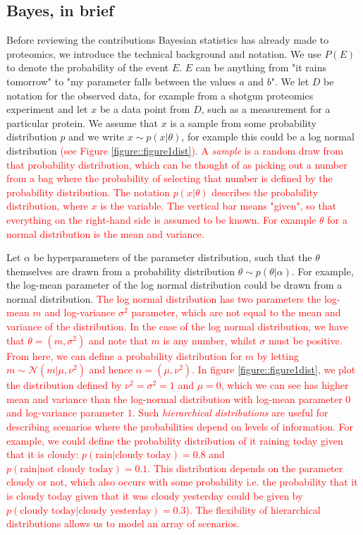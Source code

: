 \documentclass[12pt,english, journal=jpr, layout=twocolumn]{article}
\begin{document}
\subsection{Bayes, in brief}
Before reviewing the contributions Bayesian statistics has already made to proteomics, we introduce the technical background and notation. We use $P(E)$ to denote the probability of the event $E$. $E$ can be anything from "it rains tomorrow" to "my parameter falls between the values $a$ and $b$". We let $D$ be notation for the observed data, for example from a shotgun proteomics experiment and let $x$ be a data point from $D$, such as a measurement for a particular protein. We assume that $x$ is a sample from some probability distribution $p$ and we write $x \sim p(x|\theta)$, for example this could be a log normal distribution \textcolor{red}{(see Figure \ref{figure::figure1dist})}.\textcolor{red}{ A \textit{sample} is a random draw from that probability distribution, which can be thought of as picking out a number from a bag where the probability of selecting that number is defined by the probability distribution. The notation $p(x|\theta)$ describes the probability distribution, where $x$ is the variable. The vertical bar means "given", so that everything on the right-hand side is assumed to be known. For example $\theta$ for a normal distribution is the mean and variance. }


 Let $\alpha$ be hyperparameters of the parameter distribution, such that the $\theta$ themselves are drawn from a probability distribution $\theta \sim p(\theta|\alpha)$. For example, the log-mean parameter of the log normal distribution could be drawn from a normal distribution. \textcolor{red}{The log normal distribution has two parameters the log-mean $m$ and log-variance $\sigma^2$ parameter, which are not equal to the mean and variance of the distribution. In the case of the log normal distribution, we have that $\theta = (m, \sigma^2)$ and note that $m$ is any number, whilst $\sigma$ must be positive. From here, we can define a probability distribution for $m$ by letting $m \sim \mathcal{N}(m|\mu,\nu^2)$ and hence $\alpha = (\mu, \nu^2)$. In figure \ref{figure::figure1dist}, we plot the distribution defined by $\nu^2 = \sigma^2 = 1$ and $\mu = 0$, which we can see has higher mean and variance than the log-normal distribution with log-mean parameter $0$ and log-variance parameter $1$. Such \textit{hierarchical distributions} are useful for describing scenarios where the probabilities depend on levels of information. For example, we could define the probability distribution of it raining today given that it is cloudy: $p(\text{rain}|\text{cloudy today}) = 0.8$ and $p(\text{rain}|\text{not cloudy today}) = 0.1$. This distribution depends on the parameter cloudy or not, which also occurs with some probability i.e. the probability that it is cloudy today given that it was cloudy yesterday could be given by $p(\text{cloudy today}| \text{cloudy yesterday}) = 0.3$). The flexibility of hierarchical distributions allows us to model an array of scenarios.}  
\end{document}
